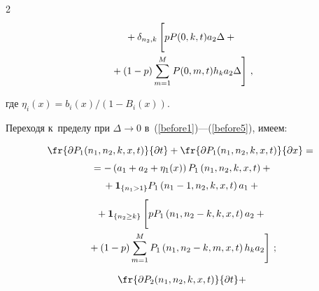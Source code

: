 \begin{multicols}{2}
\begin{multline}
{}+


\delta_{n_2,k}\left[


\vphantom{\sum\limits_{m=1}^{M}}


pP(0,k,t)a_2\Delta+{}\right.\\


\left.{}+(1-p)\sum\limits_{m=1}^{M}


P(0,m,t)h_k a_2\Delta\right]\,,


\label{before5}


\end{multline}


где $\eta_i(x)=b_i(x)/(1-B_i(x))$.





Переходя к~пределу при $\Delta\to 0$ в~(\ref{before1})---(\ref{before5}), имеем:


\begin{multline}


\fr{\partial P_1(n_1,n_2,k,x,t)}{\partial t}+


\fr{\partial P_1(n_1,n_2,k,x,t)}{\partial x}={}\\[3pt]


{}=


-\left(a_1+a_2+\eta_1(x)\right)P_1\left(n_1,n_2,k,x,t\right)+{}\\[3pt]


{}+\mathbf{1}_{\{n_1>1\}}P_1\left(n_1-1,n_2,k,x,t\right)a_1+{}\\[3pt]


{}+\mathbf{1}_{\{n_2\geq k\}}\left[


\vphantom{\sum\limits_{m=1}^{M}}


pP_1\left(n_1,n_2-k,k,x,t\right)a_2+{}\right.\\


\left.{}+(1-p)\sum\limits_{m=1}^{M}


P_1\left(n_1,n_2-k,m,x,t\right)h_k a_2\right]\,;


\label{after1}


\end{multline}





\vspace*{-10pt}





\noindent


\begin{multline}


\fr{\partial P_2(n_1,n_2,k,x,t)}{\partial t}+



\end{multline}
\end{multicols}
